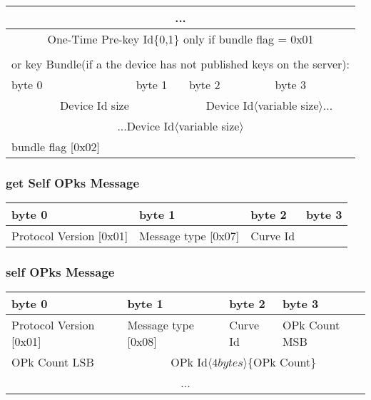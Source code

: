 \documentclass[a4paper,11pt]{article}
\begin{document}
\begin{center}
\begin{tabular}{ | p{1.4in} | p{1.4in} | p{1.4in} | p{1.4in} |}
        \multicolumn{4}{|c|}{...}\\
        \hline
        \multicolumn{4}{|c|}{One-Time Pre-key Id\{0,1\} only if bundle flag = 0x01}\\
        \hline
        \multicolumn{4}{c}{}\\
        \multicolumn{4}{c}{or key Bundle(if a the device has not published keys on the server):}\\
        \hline
        \cellcolor[gray]{0.95} byte 0 & \cellcolor[gray]{0.95} byte 1 & \cellcolor[gray]{0.95} byte 2 & \cellcolor[gray]{0.95}byte 3\\
        \hline
        \multicolumn{2}{|c|}{Device Id size}&\multicolumn{2}{c|}{Device Id$\langle$variable size$\rangle$...}\\
        \hline
        \multicolumn{4}{|c|}{...Device Id$\langle$variable size$\rangle$}\\
        \hline
        bundle flag [0x02]\\
        \cline{1-1}
      \end{tabular}
      \end{center}

    \subsubsection{get Self OPks Message}
      \begin{center}
      \begin{tabular}{ | p{1.4in} | p{1.4in} | p{1.4in} | p{1.4in} |}
        \hline
        \cellcolor[gray]{0.85} byte 0 & \cellcolor[gray]{0.85} byte 1 & \cellcolor[gray]{0.85} byte 2 & \cellcolor[gray]{0.85}byte 3\\
        \hline
        Protocol Version [0x01] & Message type [0x07] & Curve Id & \\
        \hline
      \end{tabular}
      \end{center}

    \subsubsection{self OPks Message}
      \begin{center}
      \begin{tabular}{ | p{1.4in} | p{1.4in} | p{1.4in} | p{1.4in} |}
        \hline
        \cellcolor[gray]{0.85} byte 0 & \cellcolor[gray]{0.85} byte 1 & \cellcolor[gray]{0.85} byte 2 & \cellcolor[gray]{0.85}byte 3\\
        \hline
        Protocol Version [0x01] & Message type [0x08] & Curve Id & OPk Count MSB\\
        \hline
        OPk Count LSB & \multicolumn{3}{c|}{OPk Id$\langle 4bytes\rangle $\{OPk Count\}}\\
        \cline{1-1}
        \multicolumn{4}{|c|}{...}\\
        \hline
      \end{tabular}
      \end{center}
\end{document}
